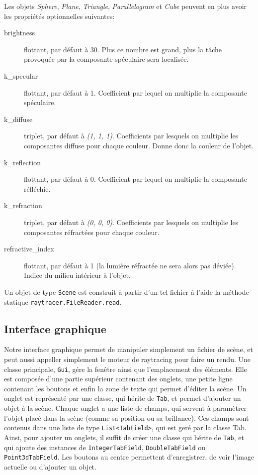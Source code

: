 \documentclass[a4paper]{article}
\begin{document}
    \bigskip
    Les objets \textit{Sphere}, \textit{Plane}, \textit{Triangle},
    \textit{Parallelogram} et \textit{Cube} peuvent en plus avoir les
    propriétés optionnelles suivantes:
    \begin{description}
      \item[brightness] flottant, par défaut à 30. Plus ce nombre est grand, plus la tâche provoquée par la composante spéculaire sera localisée.
      \item[k\_specular] flottant, par défaut à 1. Coefficient par lequel on multiplie la composante spéculaire.
      \item[k\_diffuse] triplet, par défaut à \textit{(1, 1, 1)}. Coefficients
        par lesquels on multiplie les composantes diffuse pour chaque couleur.
        Donne donc la couleur de l'objet.
      \item[k\_reflection] flottant, par défaut à 0. Coefficient par lequel on
        multiplie la composante réfléchie.
      \item[k\_refraction] triplet, par défaut à \textit{(0, 0, 0)}.
        Coefficients par lesquels on multiplie les composantes réfractées pour
        chaque couleur.
      \item[refractive\_index] flottant, par défaut à 1 (la lumière réfractée ne
        sera alors pas déviée). Indice du milieu intérieur à l'objet.
    \end{description}

    \bigskip
    Un objet de type \verb+Scene+ est construit à partir d'un tel fichier à
    l'aide la méthode statique \verb+raytracer.FileReader.read+.

  \subsection{Interface graphique}
    Notre interface graphique permet de manipuler simplement un fichier de scène, et peut aussi appeller simplement le moteur de raytracing pour faire un rendu.
    Une classe principale, \verb+Gui+, gére la fenêtre ainsi que l'emplacement des éléments.
    Elle est composée d'une partie supérieur contenant des onglets, une petite ligne contenant les boutons et enfin la zone de texte qui permet d'éditer la scène.
    Un onglet est représenté par une classe, qui hérite de \verb+Tab+, et permet d'ajouter un objet à la scène.
    Chaque onglet a une liste de champs, qui servent à paramètrer l'objet placé dans la scène (comme sa position ou sa brillance).
    Ces champs sont contenus dans une liste de type \verb+List<TabField>+,  qui est geré par la classe Tab.
    Ainsi, pour ajouter un onglets, il suffit de créer une classe qui hérite de \verb+Tab+, et qui ajoute des instances de \verb+IntegerTabField+, \verb+DoubleTabField+ ou \verb+Point3dTabField+.
    Les boutons au centre permettent d'enregistrer, de voir l'image actuelle ou d'ajouter un objet.
    
\end{document}
